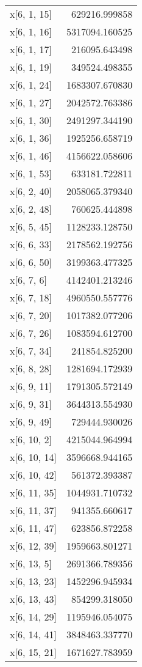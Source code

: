 \begin{longtable}{lr}
x[6, 1, 15] & 629216.999858 \\
x[6, 1, 16] & 5317094.160525 \\
x[6, 1, 17] & 216095.643498 \\
x[6, 1, 19] & 349524.498355 \\
x[6, 1, 24] & 1683307.670830 \\
x[6, 1, 27] & 2042572.763386 \\
x[6, 1, 30] & 2491297.344190 \\
x[6, 1, 36] & 1925256.658719 \\
x[6, 1, 46] & 4156622.058606 \\
x[6, 1, 53] & 633181.722811 \\
x[6, 2, 40] & 2058065.379340 \\
x[6, 2, 48] & 760625.444898 \\
x[6, 5, 45] & 1128233.128750 \\
x[6, 6, 33] & 2178562.192756 \\
x[6, 6, 50] & 3199363.477325 \\
x[6, 7, 6] & 4142401.213246 \\
x[6, 7, 18] & 4960550.557776 \\
x[6, 7, 20] & 1017382.077206 \\
x[6, 7, 26] & 1083594.612700 \\
x[6, 7, 34] & 241854.825200 \\
x[6, 8, 28] & 1281694.172939 \\
x[6, 9, 11] & 1791305.572149 \\
x[6, 9, 31] & 3644313.554930 \\
x[6, 9, 49] & 729444.930026 \\
x[6, 10, 2] & 4215044.964994 \\
x[6, 10, 14] & 3596668.944165 \\
x[6, 10, 42] & 561372.393387 \\
x[6, 11, 35] & 1044931.710732 \\
x[6, 11, 37] & 941355.660617 \\
x[6, 11, 47] & 623856.872258 \\
x[6, 12, 39] & 1959663.801271 \\
x[6, 13, 5] & 2691366.789356 \\
x[6, 13, 23] & 1452296.945934 \\
x[6, 13, 43] & 854299.318050 \\
x[6, 14, 29] & 1195946.054075 \\
x[6, 14, 41] & 3848463.337770 \\
x[6, 15, 21] & 1671627.783959 \\

\end{longtable}
